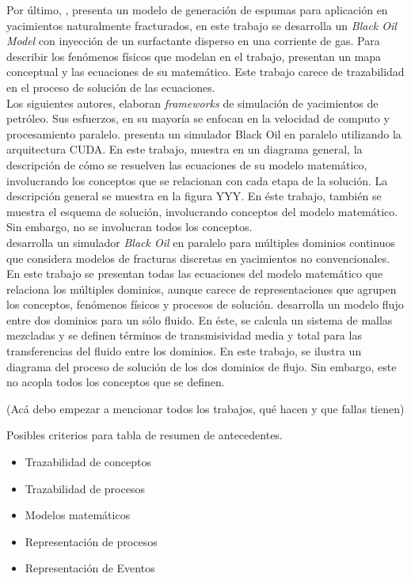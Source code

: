 Por último, \cite{solano2019modeling}, presenta un modelo de generación de espumas para aplicación en yacimientos naturalmente fracturados, en este trabajo se desarrolla un \textit{Black Oil Model} con inyección de un surfactante disperso en una corriente de gas. Para describir los fenómenos físicos que \cite{solano2019modeling} modelan en el trabajo, presentan un mapa conceptual y las ecuaciones de su matemático. Este trabajo carece de trazabilidad en el proceso de solución de las ecuaciones.\\

Los siguientes autores, elaboran \textit{frameworks} de simulación de yacimientos de petróleo. Sus esfuerzos, en su mayoría se enfocan en la velocidad de computo y procesamiento paralelo. \cite{Zaza2016} presenta un simulador Black Oil en paralelo utilizando la arquitectura CUDA. En este trabajo, \cite{Zaza2016} muestra en un diagrama general, la descripción de cómo se resuelven las ecuaciones de su modelo matemático, involucrando los conceptos que se relacionan con cada etapa de la solución. La descripción general se muestra en la figura YYY. En éste trabajo, también se muestra el esquema de solución, involucrando conceptos del modelo matemático. Sin embargo, no se involucran todos los conceptos.\\

\cite{Wang2016, Wang2017} desarrolla un simulador \textit{Black Oil} en paralelo para múltiples dominios continuos que considera modelos de fracturas discretas en yacimientos no convencionales. En este trabajo se presentan todas las ecuaciones del modelo matemático que relaciona los múltiples dominios, aunque carece de representaciones que agrupen los conceptos, fenómenos físicos y procesos de solución. \cite{FANG2017} desarrolla un modelo flujo entre dos dominios para un sólo fluido. En éste, se calcula un sistema de mallas mezcladas y se definen términos de transmisividad media y total para las transferencias del fluido entre los dominios. En este trabajo, se ilustra un diagrama del proceso de solución de los dos dominios de flujo. Sin embargo, este no acopla todos los conceptos que se definen.




(Acá debo empezar a mencionar todos los trabajos, qué hacen y que fallas tienen)


Posibles criterios para tabla de resumen de antecedentes.
\begin{itemize}
	\item  Trazabilidad de conceptos
	\item  Trazabilidad de procesos
	\item  Modelos matemáticos
	\item  Representación de procesos
	\item  Representación de Eventos
\end{itemize}


